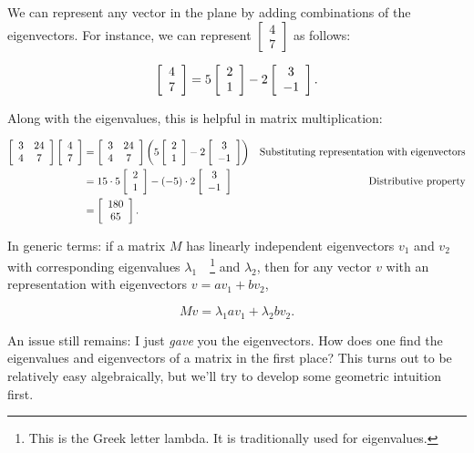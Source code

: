 \documentclass[../textbook.tex]{subfiles}
\begin{document}
We can represent any vector in the plane by adding combinations of the eigenvectors. For instance, we can represent $\left[\begin{array}{c} 4 \\ 7 \end{array}\right]$ as follows:

$$\left[\begin{array}{c} 4 \\ 7 \end{array}\right] = 5\left[\begin{array}{c} 2 \\ 1 \end{array}\right] - 2\left[\begin{array}{c} 3 \\ -1 \end{array}\right].$$

\noindent Along with the eigenvalues, this is helpful in matrix multiplication:

\begin{align*}
\left[\begin{array}{cc} 3 & 24 \\ 4 & 7 \end{array}\right]\left[\begin{array}{c} 4 \\ 7 \end{array}\right]&=\left[\begin{array}{cc} 3 & 24 \\ 4 & 7 \end{array}\right]\left(5\left[\begin{array}{c} 2 \\ 1 \end{array}\right]-2\left[\begin{array}{c} 3 \\ -1 \end{array}\right]\right) & \text{Substituting representation with eigenvectors} \\
&= 15\cdot 5 \left[\begin{array}{c} 2 \\ 1 \end{array}\right] - (-5)\cdot 2 \left[\begin{array}{c} 3 \\ -1 \end{array}\right] & \text{Distributive property} \\
&= \left[\begin{array}{c} 180 \\ 65 \end{array}\right].
\end{align*}

\noindent In generic terms: if a matrix $M$ has linearly independent eigenvectors $v_1$ and $v_2$ with corresponding eigenvalues $\lambda_1\quad$\footnote{This is the Greek letter lambda. It is traditionally used for eigenvalues.} and $\lambda_2$, then for any vector $v$ with an representation with eigenvectors $v=av_1+bv_2$,

$$Mv=\lambda_1av_1 + \lambda_2bv_2.$$

\noindent An issue still remains: I just \textit{gave} you the eigenvectors. How does one find the eigenvalues and eigenvectors of a matrix in the first place? This turns out to be relatively easy algebraically, but we'll try to develop some geometric intuition first.
\end{document}
